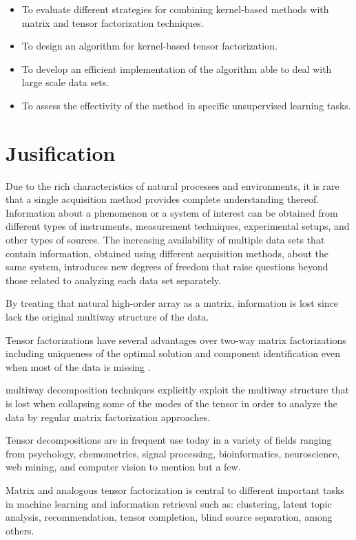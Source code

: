 \documentclass[letterpaper,12pt]{article}
\begin{document}
\begin{itemize}
\item To evaluate different strategies for combining kernel-based methods with matrix and tensor factorization techniques.
\item To design an algorithm for kernel-based tensor factorization.
\item To develop an efficient implementation of the algorithm able to deal with large scale data sets.
\item To assess the effectivity of the method in specific unsupervised learning tasks.
\end{itemize}


\section{Jusification}


Due to the rich characteristics of natural processes and environments, it is rare that a single acquisition method provides complete understanding thereof. Information about a phenomenon or a system of interest can be obtained from different types of instruments, measurement techniques, experimental setups, and other types of sources. The increasing availability of multiple data sets that contain information, obtained using different acquisition methods, about the same system, introduces new degrees of freedom that raise questions beyond those related to analyzing each data set separately.

By treating that natural high-order array as a matrix, information is lost since lack the original multiway structure of the data.


Tensor factorizations have several advantages over two-way matrix factorizations including uniqueness of the optimal solution and component identification even when most of the data is missing \cite{Morup2011}. 

multiway decomposition techniques explicitly exploit the multiway structure that is lost when collapsing some of the modes of the tensor in order to analyze the data by regular matrix factorization approaches.

Tensor decompositions are in frequent use today in a variety of fields ranging from psychology, chemometrics, signal processing, bioinformatics, neuroscience, web mining, and computer vision to mention but a few.

Matrix and analogous tensor factorization is central to different important tasks in machine learning and information retrieval such as: clustering, latent topic analysis, recommendation, tensor completion, blind source separation, among others.
\end{document}
